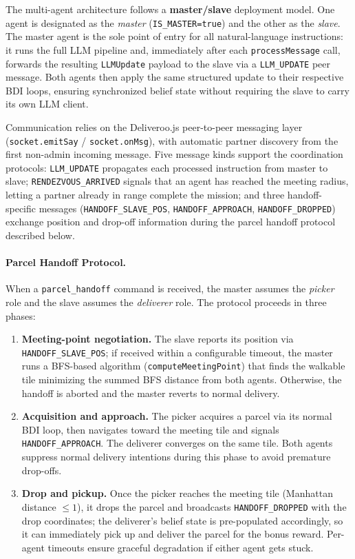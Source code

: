 The multi-agent architecture follows a \textbf{master/slave} deployment model. One agent is designated as the \textit{master} (\texttt{IS\_MASTER=true}) and the other as the \textit{slave}. The master agent is the sole point of entry for all natural-language instructions: it runs the full LLM pipeline and, immediately after each \texttt{processMessage} call, forwards the resulting \texttt{LLMUpdate} payload to the slave via a \texttt{LLM\_UPDATE} peer message. Both agents then apply the same structured update to their respective BDI loops, ensuring synchronized belief state without requiring the slave to carry its own LLM client.

Communication relies on the Deliveroo.js peer-to-peer messaging layer (\texttt{socket.emitSay} / \texttt{socket.onMsg}), with automatic partner discovery from the first non-admin incoming message. Five message kinds support the coordination protocols: \texttt{LLM\_UPDATE} propagates each processed instruction from master to slave; \texttt{RENDEZVOUS\_ARRIVED} signals that an agent has reached the meeting radius, letting a partner already in range complete the mission; and three handoff-specific messages (\texttt{HANDOFF\_SLAVE\_POS}, \texttt{HANDOFF\_APPROACH}, \texttt{HANDOFF\_DROPPED}) exchange position and drop-off information during the parcel handoff protocol described below.

\paragraph{Parcel Handoff Protocol.}
When a \texttt{parcel\_handoff} command is received, the master assumes the \textit{picker} role and the slave assumes the \textit{deliverer} role. The protocol proceeds in three phases:

\begin{enumerate}
    \item \textbf{Meeting-point negotiation.} The slave reports its position via \texttt{HANDOFF\_SLAVE\_POS}; if received within a configurable timeout, the master runs a BFS-based algorithm (\texttt{computeMeetingPoint}) that finds the walkable tile minimizing the summed BFS distance from both agents. Otherwise, the handoff is aborted and the master reverts to normal delivery.

    \item \textbf{Acquisition and approach.} The picker acquires a parcel via its normal BDI loop, then navigates toward the meeting tile and signals \texttt{HANDOFF\_APPROACH}. The deliverer converges on the same tile. Both agents suppress normal delivery intentions during this phase to avoid premature drop-offs.

    \item \textbf{Drop and pickup.} Once the picker reaches the meeting tile (Manhattan distance $\leq 1$), it drops the parcel and broadcasts \texttt{HANDOFF\_DROPPED} with the drop coordinates; the deliverer's belief state is pre-populated accordingly, so it can immediately pick up and deliver the parcel for the bonus reward. Per-agent timeouts ensure graceful degradation if either agent gets stuck.
\end{enumerate}